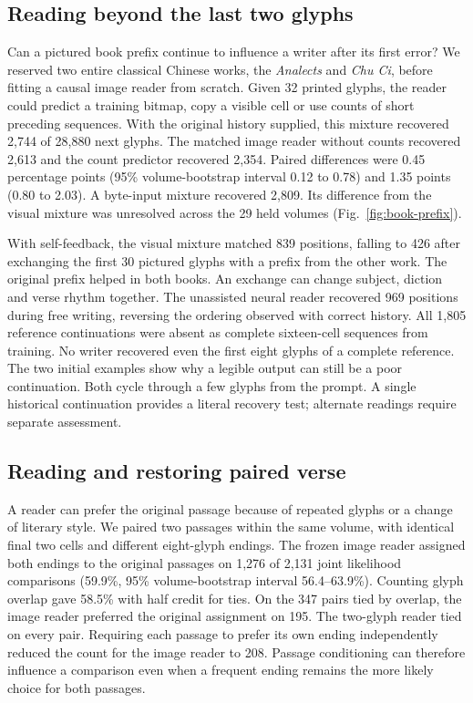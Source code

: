 \documentclass[12pt,a4paper]{article}
\providecommand{\DIFadd}[1]{{\protect\color{blue} \sf #1}} %
\begin{document}
\subsection*{\DIFadd{Reading beyond the last two glyphs}}
\DIFadd{Can a pictured book prefix continue to influence a writer after its first error? We reserved two entire classical Chinese works, the \emph{Analects} and \emph{Chu Ci}, before fitting a causal image reader from scratch. Given 32 printed glyphs, the reader could predict a training bitmap, copy a visible cell or use counts of short preceding sequences. With the original history supplied, this mixture recovered 2,744 of 28,880 next glyphs. The matched image reader without counts recovered 2,613 and the count predictor recovered 2,354. Paired differences were 0.45 percentage points (95\% volume-bootstrap interval 0.12 to 0.78) and 1.35 points (0.80 to 2.03). A byte-input mixture recovered 2,809. Its difference from the visual mixture was unresolved across the 29 held volumes (Fig.~\ref{fig:book-prefix}).
}

\DIFadd{With self-feedback, the visual mixture matched 839 positions, falling to 426 after exchanging the first 30 pictured glyphs with a prefix from the other work. The original prefix helped in both books. An exchange can change subject, diction and verse rhythm together. The unassisted neural reader recovered 969 positions during free writing, reversing the ordering observed with correct history. All 1,805 reference continuations were absent as complete sixteen-cell sequences from training. No writer recovered even the first eight glyphs of a complete reference. The two initial examples show why a legible output can still be a poor continuation. Both cycle through a few glyphs from the prompt. A single historical continuation provides a literal recovery test; alternate readings require separate assessment.
}

\subsection*{\DIFadd{Reading and restoring paired verse}}
\DIFadd{A reader can prefer the original passage because of repeated glyphs or a change of literary style. We paired two passages within the same volume, with identical final two cells and different eight-glyph endings. The frozen image reader assigned both endings to the original passages on 1,276 of 2,131 joint likelihood comparisons (59.9\%, 95\% volume-bootstrap interval 56.4--63.9\%). Counting glyph overlap gave 58.5\% with half credit for ties. On the 347 pairs tied by overlap, the image reader preferred the original assignment on 195. The two-glyph reader tied on every pair. Requiring each passage to prefer its own ending independently reduced the count for the image reader to 208. Passage conditioning can therefore influence a comparison even when a frequent ending remains the more likely choice for both passages.
}
\end{document}
